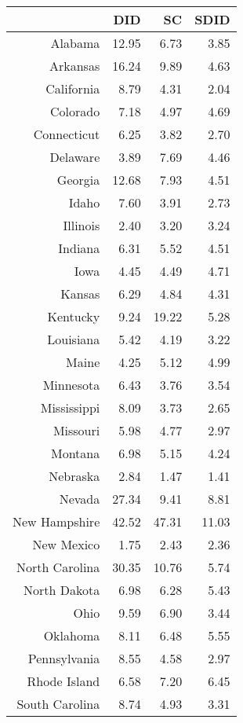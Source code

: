 \begin{table}[ht]
\centering
\begin{tabular}{rrrr}
  \hline
 & DID & SC & SDID \\ 
  \hline
Alabama & 12.95 & 6.73 & 3.85 \\ 
  Arkansas & 16.24 & 9.89 & 4.63 \\ 
  California & 8.79 & 4.31 & 2.04 \\ 
  Colorado & 7.18 & 4.97 & 4.69 \\ 
  Connecticut & 6.25 & 3.82 & 2.70 \\ 
  Delaware & 3.89 & 7.69 & 4.46 \\ 
  Georgia & 12.68 & 7.93 & 4.51 \\ 
  Idaho & 7.60 & 3.91 & 2.73 \\ 
  Illinois & 2.40 & 3.20 & 3.24 \\ 
  Indiana & 6.31 & 5.52 & 4.51 \\ 
  Iowa & 4.45 & 4.49 & 4.71 \\ 
  Kansas & 6.29 & 4.84 & 4.31 \\ 
  Kentucky & 9.24 & 19.22 & 5.28 \\ 
  Louisiana & 5.42 & 4.19 & 3.22 \\ 
  Maine & 4.25 & 5.12 & 4.99 \\ 
  Minnesota & 6.43 & 3.76 & 3.54 \\ 
  Mississippi & 8.09 & 3.73 & 2.65 \\ 
  Missouri & 5.98 & 4.77 & 2.97 \\ 
  Montana & 6.98 & 5.15 & 4.24 \\ 
  Nebraska & 2.84 & 1.47 & 1.41 \\ 
  Nevada & 27.34 & 9.41 & 8.81 \\ 
  New Hampshire & 42.52 & 47.31 & 11.03 \\ 
  New Mexico & 1.75 & 2.43 & 2.36 \\ 
  North Carolina & 30.35 & 10.76 & 5.74 \\ 
  North Dakota & 6.98 & 6.28 & 5.43 \\ 
  Ohio & 9.59 & 6.90 & 3.44 \\ 
  Oklahoma & 8.11 & 6.48 & 5.55 \\ 
  Pennsylvania & 8.55 & 4.58 & 2.97 \\ 
  Rhode Island & 6.58 & 7.20 & 6.45 \\ 
  South Carolina & 8.74 & 4.93 & 3.31 \\ 

\end{tabular}
\end{table}
